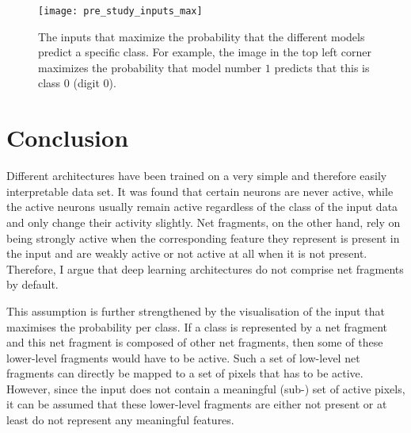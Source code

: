 \begin{figure}[h]
    \centering
    \texttt{[image: pre\_study\_inputs\_max]}
    \caption[Inputs that Maximize the Class Output Probability]{The inputs that maximize the probability that the different models predict a specific class. For example, the image in the top left corner maximizes the probability that model number $1$ predicts that this is class $0$ (digit $0$).}
\end{figure}


\section{Conclusion}
Different architectures have been trained on a very simple and therefore easily interpretable data set.
It was found that certain neurons are never active, while the active neurons usually remain active regardless of the class of the input data and only change their activity slightly.
Net fragments, on the other hand, rely on being strongly active when the corresponding feature they represent is present in the input and are weakly active or not active at all when it is not present.
Therefore, I argue that deep learning architectures do not comprise net fragments by default.

This assumption is further strengthened by the visualisation of the input that maximises the probability per class.
If a class is represented by a net fragment and this net fragment is composed of other net fragments, then some of these lower-level fragments would have to be active.
Such a set of low-level net fragments can directly be mapped to a set of pixels that has to be active.
However, since the input does not contain a meaningful (sub-) set of active pixels, it can be assumed that these lower-level fragments are either not present or at least do not represent any meaningful features.


